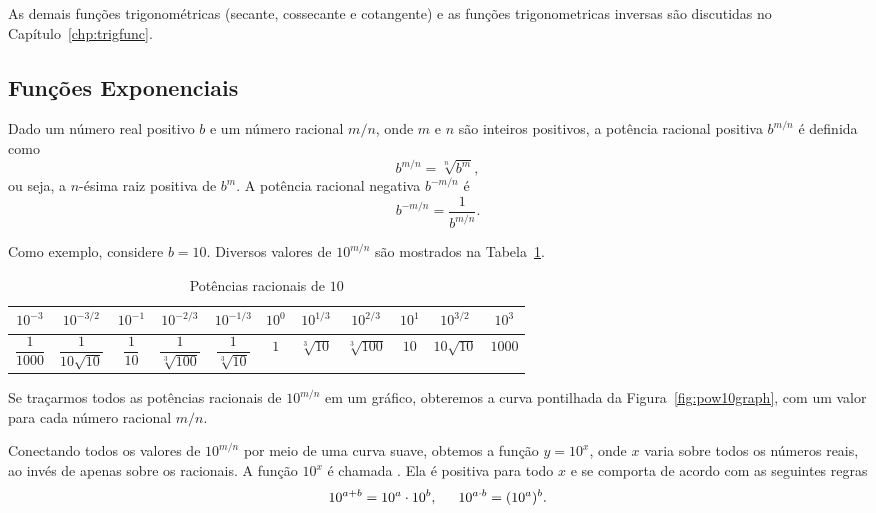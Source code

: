 As demais funções trigonométricas (secante, cossecante e cotangente) e
as funções trigonometricas inversas são discutidas no
Capítulo~\ref{chp:trigfunc}.

\subsection{Funções Exponenciais}

Dado um número real positivo $b$ e um número racional $m/n$, onde $m$ e $n$
são inteiros positivos, a potência racional positiva $b^{m/n}$ é definida como
$$
  b^{m/n} = \sqrt[n]{b^m},
$$
ou seja, a $n$-ésima raiz positiva de $b^m$. A potência racional negativa
$b^{-m/n}$ é
$$
  b^{-m/n} = \frac{1}{b^{m/n}}.
$$

Como exemplo, considere $b = 10$. Diversos valores de $10^{m/n}$ são mostrados
na Tabela~\ref{tab:pow10}.

\begin{table}
\caption{Potências racionais de $10$}\label{tab:pow10}
\begingroup
\setlength{\tabcolsep}{1ex}
\setlength{\extrarowheight}{1em}
\begin{tabular}{c|c|c|c|c|c|c|c|c|c|c}
\hline
  $10^{-3}$ & $10^{-3/2}$ & $10^{-1}$ & $10^{-2/3}$ & $10^{-1/3}$ & $10^0$ &
    $10^{1/3}$ & $10^{2/3}$ & $10^1$ & $10^{3/2}$ & $10^3$ \\[\extrarowheight]
\hline
  $\dfrac{1}{1000}$ & $\dfrac{1}{10\sqrt{10}}$ & $\dfrac{1}{10}$ &
    $\dfrac{1}{\sqrt[3]{100}}$ & $\dfrac{1}{\sqrt[3]{10}}$ & $1$ &
    $\sqrt[3]{10}$ & $\sqrt[3]{100}$ & $10$ & $10\sqrt{10}$ & $1000$ \\[\extrarowheight]
\hline
\end{tabular}
\endgroup
\end{table}

Se traçarmos todos as potências racionais de $10^{m/n}$ em um gráfico,
obteremos a curva pontilhada da Figura~\ref{fig:pow10graph}, com um valor
para cada número racional $m/n$.


Conectando todos os valores de $10^{m/n}$ por meio de uma curva suave,
obtemos a função $y = 10^x$, onde $x$ varia sobre todos os números reais,
ao invés de apenas sobre os racionais. A função $10^x$ é chamada
.
Ela é positiva para todo $x$ e se comporta de acordo com as seguintes regras
$$
  10^{a+b} = 10^a \cdot 10^b, \hspace{1.5em} 10^{a \cdot b} = (10^a)^b.
$$

